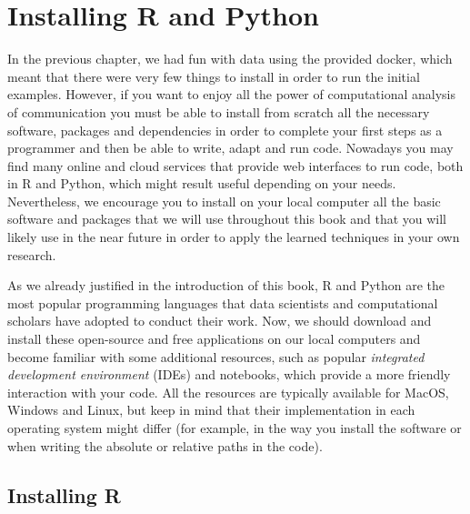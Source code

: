 \section{Installing R and Python}

In the previous chapter, we had fun with data using the provided
docker, which meant that there were very few things to install in
order to run the initial examples. However, if you want to enjoy all
the power of computational analysis of communication you must be able
to install from scratch all the necessary software, packages and
dependencies in order to complete your first steps as a programmer and
then be able to write, adapt and run code. Nowadays you may find many
online and cloud services that provide web interfaces to run code,
both in R and Python, which might result useful depending on your
needs. Nevertheless, we encourage you to install on your local
computer all the basic software and packages that we will use
throughout this book and that you will likely use in the near future
in order to apply the learned techniques in your own research.

As we already justified in the introduction of this book, R and Python
are the most popular programming languages that data scientists and
computational scholars have adopted to conduct their work.  Now, we
should download and install these open-source and free applications on
our local computers and become familiar with some additional
resources, such as popular \emph{integrated development environment}
(IDEs) and notebooks, which provide a more friendly interaction with
your code. All the resources are typically available for MacOS,
Windows and Linux, but keep in mind that their implementation in each
operating system might differ (for example, in the way you install the
software or when writing the absolute or relative paths in the code).


\subsection{Installing R}

